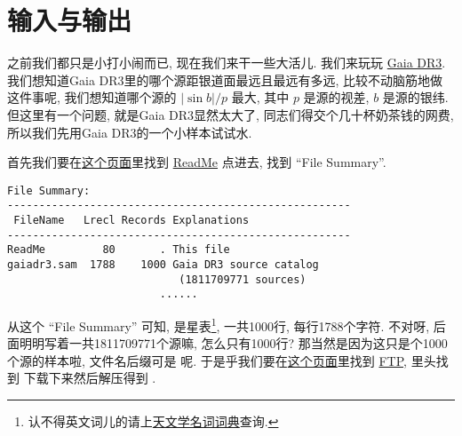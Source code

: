 \chapter{输入与输出}\label{io}

之前我们都只是小打小闹而已, 现在我们来干一些大活儿. 我们来玩玩 \href{https://cdsarc.cds.unistra.fr/viz-bin/cat/I/355}{Gaia DR3}. 我们想知道Gaia DR3里的哪个源距银道面最远且最远有多远, 比较不动脑筋地做这件事呢, 我们想知道哪个源的 $ \left\lvert \sin b\right\rvert/p $ 最大, 其中 $ p $ 是源的视差, $ b $ 是源的银纬. 但这里有一个问题, 就是Gaia DR3显然太大了, 同志们得交个几十杯奶茶钱的网费, 所以我们先用Gaia DR3的一个小样本试试水. 

首先我们要在\href{https://cdsarc.cds.unistra.fr/viz-bin/cat/I/355}{这个页面}里找到 \href{https://cdsarc.cds.unistra.fr/viz-bin/ReadMe/I/355?format=html&tex=true}{ReadMe} 点进去, 找到 ``File Summary''. 
\begin{lstlisting}
File Summary:
------------------------------------------------------
 FileName   Lrecl Records Explanations
------------------------------------------------------
ReadMe         80       . This file
gaiadr3.sam  1788    1000 Gaia DR3 source catalog
                           (1811709771 sources)
                        ...... 
\end{lstlisting}
从这个 ``File Summary'' 可知,  是星表\footnote{认不得英文词儿的请上\href{https://nadc. china-vo. org/astrodict/}{天文学名词词典}查询.}, 一共1000行, 每行1788个字符. 不对呀, 后面明明写着一共1811709771个源嘛, 怎么只有1000行? 那当然是因为这只是个1000个源的样本啦, 文件名后缀可是   呢. 于是乎我们要在\href{https://cdsarc.cds.unistra.fr/viz-bin/cat/I/355}{这个页面}里找到 \href{https://cdsarc.cds.unistra.fr/ftp/I/355}{FTP}, 里头找到 \href{https://cdsarc.cds.unistra.fr/ftp/I/355/gaiadr3.sam.gz}{} 下载下来然后解压得到  . 

